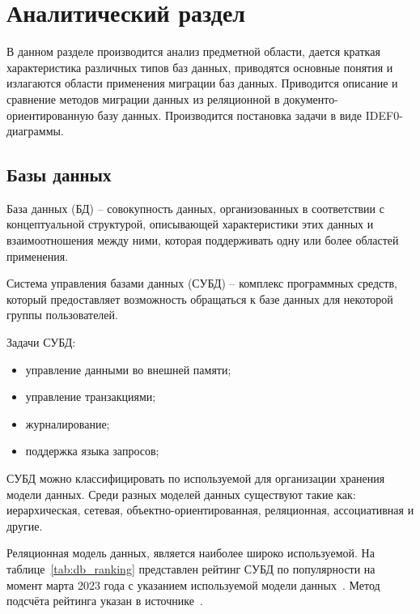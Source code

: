 \chapter{Аналитический раздел}

В данном разделе производится анализ предметной области, 
дается краткая характеристика различных типов баз данных,
приводятся основные понятия и излагаются области применения миграции баз данных. 
Приводится описание и сравнение методов миграции данных 
из реляционной в документо-ориентированную базу данных. 
Производится постановка задачи в виде IDEF0-диаграммы.


\section{Базы данных}

База данных (БД) -- совокупность данных, организованных в соответствии
с концептуальной структурой, описывающей характеристики этих данных и
взаимоотношения между ними, которая поддерживать одну 
или более областей применения.

Система управления базами данных (СУБД) -- комплекс программных средств,
который предоставляет возможность обращаться к базе данных 
для некоторой группы пользователей.
 
Задачи СУБД:
\begin{itemize}[label=---]
    \item управление данными во внешней памяти;
    \item управление транзакциями;
    \item журналирование;
    \item поддержка языка запросов;
\end{itemize}

СУБД можно классифицировать по используемой для организации хранения модели данных.
Среди разных моделей данных существуют такие как:
иерархическая, сетевая, объектно-ориентированная, реляционная, ассоциативная и другие.

Реляционная модель данных, является наиболее широко используемой.
На таблице~\ref{tab:db_ranking} представлен рейтинг СУБД по популярности на момент
марта 2023 года с указанием используемой модели данных~\cite{db_rating}. 
Метод подсчёта рейтинга указан в источнике~\cite{rating-def}.

\clearpage

